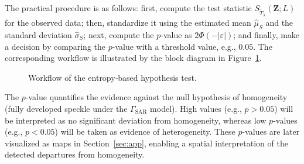\documentclass[
  lettersize  journal,
]{IEEEtran}%
\begin{document}
The practical procedure is as follows: first, compute the test statistic
\(S_{\widetilde T_\lambda}(\bm{Z}; L)\) for the observed data; then,
standardize it using the estimated mean \(\widehat{\mu}_S\) and the
standard deviation \(\widehat{\sigma}_S\); next, compute the \(p\)-value
as \(2\Phi(-|\varepsilon|)\); and finally, make a decision by comparing
the \(p\)-value with a threshold value, e.g., \(0.05\). The
corresponding workflow is illustrated by the block diagram in
Figure~\ref{fig:entropy-diagram-test}.

\begin{figure}[hbt]
    \centering
{}
    \caption{Workflow of the entropy‐based hypothesis test.}
    \label{fig:entropy-diagram-test}
\end{figure}

The \(p\)-value quantifies the evidence against the null hypothesis of
homogeneity (fully developed speckle under the \(\Gamma_{\text{SAR}}\)
model). High values (e.g., \(p>0.05\)) will be interpreted as no
significant deviation from homogeneity, whereas low \(p\)-values (e.g.,
\(p<0.05\)) will be taken as evidence of heterogeneity. These
\(p\)-values are later visualized as maps in Section~\ref{sec:app},
enabling a spatial interpretation of the detected departures from
homogeneity.
\end{document}
